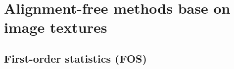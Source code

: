 \documentclass[10pt]{beamer}
\newcommand{\1}{
	\setbeamertemplate{background}{
		\texttt{[image: img/1]}
		\tikz[overlay] \fill[fill opacity=0.75,fill=white] (0,0) rectangle (-\paperwidth,\paperheight);
	}
}
\begin{document}
\section{Alignment-free methods base on image textures}

\subsection{First-order statistics (FOS)} \label{section:fos}


\end{document}
